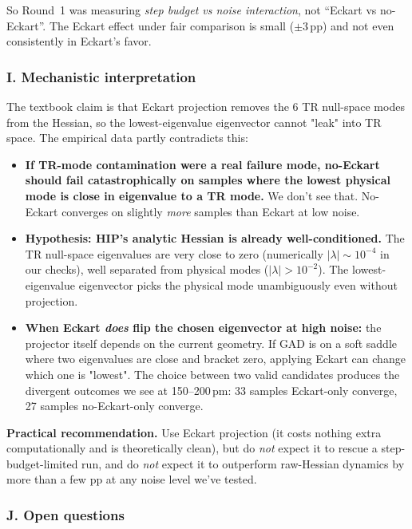 \documentclass[11pt]{article}
\begin{document}
So Round~1 was measuring \emph{step budget vs noise interaction}, not
``Eckart vs no-Eckart''. The Eckart effect under fair comparison is
small ($\pm$3\,pp) and not even consistently in Eckart's favor.

\subsubsection*{I. Mechanistic interpretation}

The textbook claim is that Eckart projection removes the 6 TR null-space
modes from the Hessian, so the lowest-eigenvalue eigenvector cannot
"leak" into TR space. The empirical data partly contradicts this:

\begin{itemize}[nosep,leftmargin=1.5em]
\item \textbf{If TR-mode contamination were a real failure mode, no-Eckart
      should fail catastrophically on samples where the lowest physical
      mode is close in eigenvalue to a TR mode.} We don't see that.
      No-Eckart converges on slightly \emph{more} samples than Eckart
      at low noise.
\item \textbf{Hypothesis: HIP's analytic Hessian is already well-conditioned.}
      The TR null-space eigenvalues are very close to zero (numerically
      $|\lambda| \sim 10^{-4}$ in our checks), well separated from
      physical modes ($|\lambda| > 10^{-2}$). The lowest-eigenvalue
      eigenvector picks the physical mode unambiguously even without
      projection.
\item \textbf{When Eckart \emph{does} flip the chosen eigenvector at
      high noise:} the projector itself depends on the current geometry.
      If GAD is on a soft saddle where two eigenvalues are close and
      bracket zero, applying Eckart can change which one is "lowest".
      The choice between two valid candidates produces the divergent
      outcomes we see at 150--200\,pm: 33 samples Eckart-only converge,
      27 samples no-Eckart-only converge.
\end{itemize}

\textbf{Practical recommendation.} Use Eckart projection (it costs
nothing extra computationally and is theoretically clean), but do
\emph{not} expect it to rescue a step-budget-limited run, and do
\emph{not} expect it to outperform raw-Hessian dynamics by more than
a few pp at any noise level we've tested.

\subsubsection*{J. Open questions}
\end{document}
